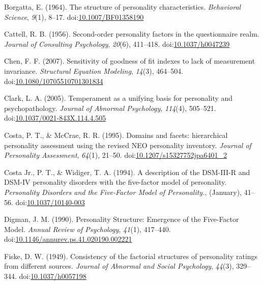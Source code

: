 \documentclass[man]{apa6}
\theoremstyle{definition}
\theoremstyle{definition}
\theoremstyle{definition}
\theoremstyle{remark}
\begin{document}
\leavevmode\hypertarget{ref-Borgatta1964}{}%
Borgatta, E. (1964). The structure of personality characteristics.
\emph{Behavioral Science}, \emph{9}(1), 8--17.
doi:\href{https://doi.org/10.1007/BF01358190}{10.1007/BF01358190}

\leavevmode\hypertarget{ref-Cattell1956}{}%
Cattell, R. B. (1956). Second-order personality factors in the
questionnaire realm. \emph{Journal of Consulting Psychology},
\emph{20}(6), 411--418.
doi:\href{https://doi.org/10.1037/h0047239}{10.1037/h0047239}

\leavevmode\hypertarget{ref-Chen2007}{}%
Chen, F. F. (2007). Sensitivity of goodness of fit indexes to lack of
measurement invariance. \emph{Structural Equation Modeling},
\emph{14}(3), 464--504.
doi:\href{https://doi.org/10.1080/10705510701301834}{10.1080/10705510701301834}

\leavevmode\hypertarget{ref-Clark2005}{}%
Clark, L. A. (2005). Temperament as a unifying basis for personality and
psychopathology. \emph{Journal of Abnormal Psychology}, \emph{114}(4),
505--521.
doi:\href{https://doi.org/10.1037/0021-843X.114.4.505}{10.1037/0021-843X.114.4.505}

\leavevmode\hypertarget{ref-Costa1995}{}%
Costa, P. T., \& McCrae, R. R. (1995). Domains and facets: hierarchical
personality assessment using the revised NEO personality inventory.
\emph{Journal of Personality Assessment}, \emph{64}(1), 21--50.
doi:\href{https://doi.org/10.1207/s15327752jpa6401_2}{10.1207/s15327752jpa6401\_2}

\leavevmode\hypertarget{ref-Widiger1994}{}%
Costa Jr., P. T., \& Widiger, T. A. (1994). A description of the
DSM-III-R and DSM-IV personality disorders with the five-factor model of
personality. \emph{Personality Disorders and the Five-Factor Model of
Personality.}, (January), 41--56.
doi:\href{https://doi.org/10.1037/10140-003}{10.1037/10140-003}

\leavevmode\hypertarget{ref-Digman1990}{}%
Digman, J. M. (1990). Personality Structure: Emergence of the
Five-Factor Model. \emph{Annual Review of Psychology}, \emph{41}(1),
417--440.
doi:\href{https://doi.org/10.1146/annurev.ps.41.020190.002221}{10.1146/annurev.ps.41.020190.002221}

\leavevmode\hypertarget{ref-Fiske1949}{}%
Fiske, D. W. (1949). Consistency of the factorial structures of
personality ratings from different sources. \emph{Journal of Abnormal
and Social Psychology}, \emph{44}(3), 329--344.
doi:\href{https://doi.org/10.1037/h0057198}{10.1037/h0057198}
\end{document}
